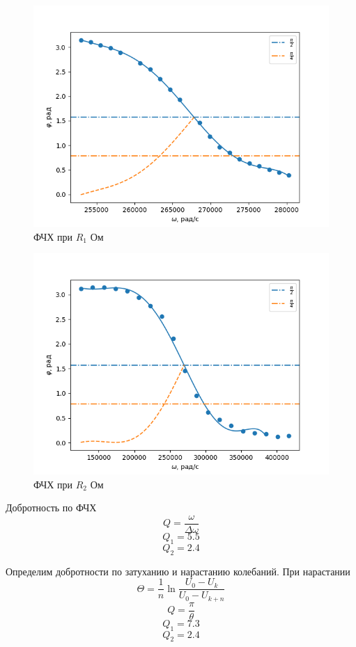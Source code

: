 \documentclass[a4paper,12 pt]{article}
\begin{document}
\begin{figure}[H]
    \centering
    \includegraphics[scale=0.8]{фчх1.png}
    \caption{ФЧХ при $R_1$ Ом}
    \label{fig:enter-label}
\end{figure}



\begin{figure}[H]
    \centering
    \includegraphics[scale=0.8]{фчх2.png}
    \caption{ФЧХ при $R_2$ Ом}
    \label{fig:enter-label}
\end{figure}

Добротность по ФЧХ
\[Q = \frac{\omega}{\Delta \omega}\]
\[Q_1 = 5.5\]
\[Q_2 = 2.4\]


Определим добротности по затуханию и нарастанию колебаний.
При нарастании
\[\Theta=\frac{1}{n} \ln \frac{U_0-U_k}{U_0-U_{k+n}}\]
\[Q = \frac{\pi}{\theta}\]
\[Q_1 = 7.3\]
\[Q_2 = 2.4\]
\end{document}

